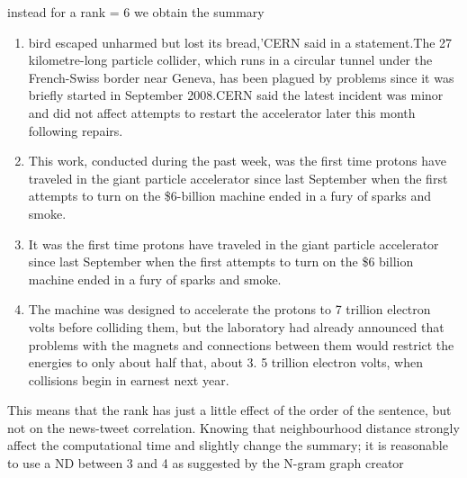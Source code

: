 instead for a rank = 6 we obtain the summary
\begin{enumerate}
	\item bird escaped unharmed but lost its bread,'CERN said in a statement.The 27 kilometre-long particle collider, which runs in a circular tunnel under the French-Swiss border near Geneva, has been plagued by problems since it was briefly started in September 2008.CERN said the latest incident was minor and did not affect attempts to restart the accelerator later this month following repairs.
	\item This work, conducted during the past week, was the first time protons have traveled in the giant particle accelerator since last September when the first attempts to turn on the \$6-billion machine ended in a fury of sparks and smoke.
	\item It was the first time protons have traveled in the giant particle accelerator since last September when the first attempts to turn on the \$6 billion machine ended in a fury of sparks and smoke.
	\item The machine was designed to accelerate the protons to 7 trillion electron volts before colliding them, but the laboratory had already announced that problems with the magnets and connections between them would restrict the energies to only about half that, about 3.  5 trillion electron volts, when collisions begin in earnest next year.
\end{enumerate}

This means that the rank has just a little effect of the order of the sentence, but not on the news-tweet correlation.
Knowing that neighbourhood distance strongly affect the computational time and slightly change the summary; it is reasonable to use a ND between 3 and 4 as suggested by the N-gram graph creator




